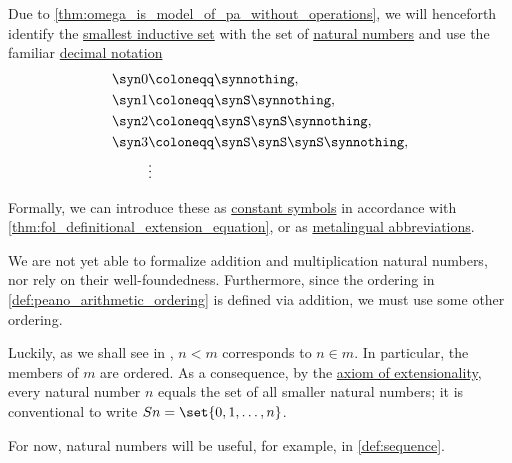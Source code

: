 \begin{remark}\label{rem:set_theory_natural_numbers_without_operations}
  Due to \cref{thm:omega_is_model_of_pa_without_operations}, we will henceforth identify the \hyperref[def:smallest_inductive_set]{smallest inductive set} with the set of \hyperref[def:natural_numbers]{natural numbers} and use the familiar \hyperref[def:positional_number_system/decimal]{decimal notation}
  \begin{align*}
    \syn0 &\coloneqq \synnothing,                   \\
    \syn1 &\coloneqq \synS \synnothing,             \\
    \syn2 &\coloneqq \synS \synS \synnothing,       \\
    \syn3 &\coloneqq \synS \synS \synS \synnothing, \\
          &\vdots
  \end{align*}

  Formally, we can introduce these as \hyperref[def:fol_signature/function]{constant symbols} in accordance with \cref{thm:fol_definitional_extension_equation}, or as \hyperref[con:syntactic_abbreviation]{metalingual abbreviations}.

  We are not yet able to formalize addition and multiplication natural numbers, nor rely on their well-foundedness. Furthermore, since the ordering in \cref{def:peano_arithmetic_ordering} is defined via addition, we must use some other ordering.

  Luckily, as we shall see in , \( n < m \) corresponds to \( n \in m \). In particular, the members of \( m \) are ordered. As a consequence, by the \hyperref[def:axiomatic_set_theory/extensionality]{axiom of extensionality}, every natural number \( n \) equals the set of all smaller natural numbers; it is conventional to write \( Sn = \set{ 0, 1, \ldots, n } \).

  For now, natural numbers will be useful, for example, in \cref{def:sequence}.
\end{remark}

